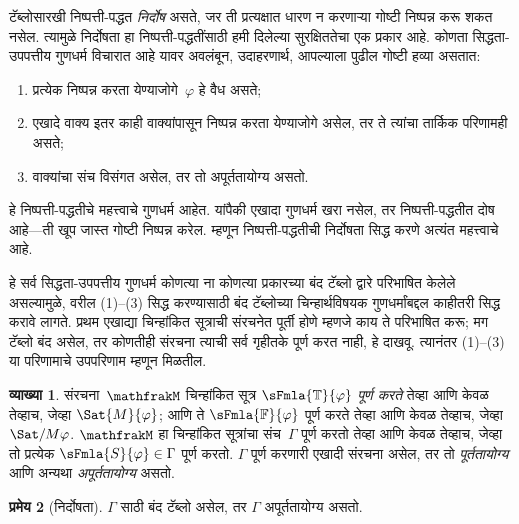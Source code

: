 \documentclass[11pt,a4paper,openany]{book}
\theoremstyle{definition}
\newtheorem{defn}{व्याख्या}[section]
\newtheorem{thm}[defn]{प्रमेय}
\newenvironment{explain}{}{}
\newcommand{\applytofirst}[2]{{\expandafter#1#2}}
\newcommand{\Struct}[1]{\applytofirst{\mathfrak}{#1}}
\newcommand{\True}{\ensuremath{\mathbb{T}}}
\newcommand{\False}{\ensuremath{\mathbb{F}}}
\begin{document}
\begin{explain}
टॅब्लोसारखी निष्पत्ती-पद्धत \emph{निर्दोष} असते, जर ती प्रत्यक्षात
धारण न करणाऱ्या गोष्टी निष्पन्न करू शकत नसेल. त्यामुळे निर्दोषता हा
निष्पत्ती-पद्धतींसाठी हमी दिलेल्या सुरक्षिततेचा एक प्रकार आहे. कोणता
सिद्धता-उपपत्तीय गुणधर्म विचारात आहे यावर अवलंबून, उदाहरणार्थ, आपल्याला
पुढील गोष्टी हव्या असतात:
\begin{enumerate}
\item प्रत्येक निष्पन्न करता येण्याजोगे~$\varphi$ हे वैध असते;
\item एखादे वाक्य इतर काही वाक्यांपासून निष्पन्न करता येण्याजोगे असेल, तर ते
  त्यांचा तार्किक परिणामही असते;
\item वाक्यांचा संच विसंगत असेल, तर तो अपूर्ततायोग्य असतो.
\end{enumerate}
हे निष्पत्ती-पद्धतीचे महत्त्वाचे गुणधर्म आहेत. यांपैकी एखादा गुणधर्म
खरा नसेल, तर निष्पत्ती-पद्धतीत दोष आहे---ती खूप जास्त गोष्टी
निष्पन्न करेल. म्हणून निष्पत्ती-पद्धतीची निर्दोषता सिद्ध करणे अत्यंत
महत्त्वाचे आहे.

हे सर्व सिद्धता-उपपत्तीय गुणधर्म कोणत्या ना कोणत्या प्रकारच्या बंद
टॅब्लो द्वारे परिभाषित केलेले असल्यामुळे, वरील (1)--(3) सिद्ध करण्यासाठी
बंद टॅब्लोच्या चिन्हार्थविषयक गुणधर्मांबद्दल काहीतरी सिद्ध करावे लागते.
प्रथम एखाद्या चिन्हांकित सूत्राची संरचनेत पूर्ती होणे म्हणजे काय ते
परिभाषित करू; मग टॅब्लो बंद असेल, तर कोणतीही संरचना त्याची सर्व गृहीतके
पूर्ण करत नाही, हे दाखवू. त्यानंतर (1)--(3) या परिणामाचे उपपरिणाम म्हणून
मिळतील.
\end{explain}

\begin{defn}
संरचना~$\Struct{M}$
चिन्हांकित सूत्र $\sFmla{\True}{\varphi}$ \emph{पूर्ण करते} तेव्हा आणि केवळ तेव्हाच, जेव्हा
$\Sat{M}{\varphi}$; आणि ते
$\sFmla{\False}{\varphi}$ पूर्ण करते तेव्हा आणि केवळ तेव्हाच, जेव्हा
$\Sat/{M}{\varphi}$. $\Struct{M}$
हा चिन्हांकित सूत्रांचा संच~$\Gamma$ पूर्ण करतो तेव्हा आणि केवळ तेव्हाच,
जेव्हा तो प्रत्येक $\sFmla{S}{\varphi} \in \Gamma$ पूर्ण करतो. $\Gamma$ पूर्ण
करणारी एखादी संरचना असेल, तर तो
\emph{पूर्ततायोग्य} आणि अन्यथा \emph{अपूर्ततायोग्य} असतो.
\end{defn}

\begin{thm}[निर्दोषता]
  \label{fol:tab:sou:thm:tableau-soundness}
  $\Gamma$ साठी बंद टॅब्लो असेल, तर $\Gamma$ अपूर्ततायोग्य असतो.
\end{thm}
\end{document}
